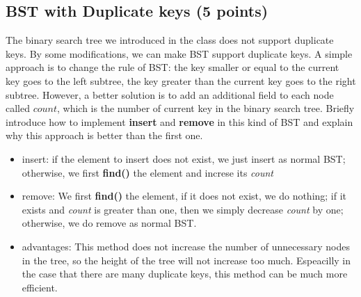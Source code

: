 \documentclass[11pt]{exam}
\begin{document}
\subsection{BST with Duplicate keys (5 points)}
The binary search tree we introduced in the class does not support duplicate keys. By some modifications, we can make BST support duplicate keys. A simple approach is to change the rule of BST: the key smaller or equal to the current key goes to the left subtree, the key greater than the current key goes to the right subtree. However, a better solution is to add an additional field to each node called $count$, which is the number of current key in the binary search tree. Briefly introduce how to implement \textbf{insert} and \textbf{remove} in this kind of BST and explain why this approach is better than the first one.

\begin{solution}
\begin{itemize}
    \item insert: if the element to insert does not exist, we just insert as normal BST;
    otherwise, we first \textbf{find()} the element and increse its {\textit{count}}
    \item remove: We first \textbf{find()} the element, if it does not exist, we do nothing; if 
    it exists and \textit{count} is greater than one, then we simply decrease \textit{count} by one;
    otherwise, we do remove as normal BST.
    \item advantages: This method does not increase the number of unnecessary nodes in the tree,
    so the height of the tree will not increase too much. Espeacilly in the case that 
    there are many duplicate keys, this method can be much more efficient.
\end{itemize}
\end{solution}
\end{document}
